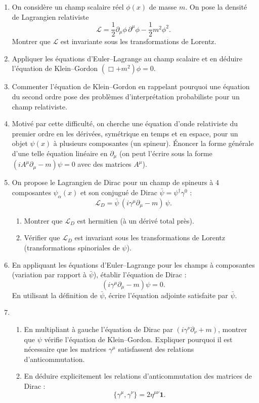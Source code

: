 \documentclass[a4paper,10pt]{report}
\begin{document}
\begin{enumerate}
	\item On considère un champ scalaire réel $\phi(x)$ de masse $m$. On pose la densité de Lagrangien relativiste 
	\[
	\mathcal{L} = \frac{1}{2} \partial_\mu \phi\,\partial^\mu \phi - \frac{1}{2} m^2 \phi^2.
	\]
	Montrer que $\mathcal{L}$ est invariante sous les transformations de Lorentz. 
	
	\item 
	Appliquer les équations d'Euler--Lagrange au champ scalaire et en déduire l'équation de Klein--Gordon $(\Box + m^2)\phi=0$. 
	
	\item 
	Commenter l'équation de Klein--Gordon en rappelant pourquoi une équation du second ordre pose des problèmes d'interprétation probabiliste pour un champ relativiste. 
	
	\item 
	Motivé par cette difficulté, on cherche une équation d'onde relativiste du premier ordre en les dérivées, symétrique en temps et en espace, pour un objet $\psi(x)$ à plusieurs composantes (un spineur). Énoncer la forme générale d'une telle équation linéaire en $\partial_\mu$ (on peut l'écrire sous la forme $(i A^\mu \partial_\mu - m)\psi=0$ avec des matrices $A^\mu$).
	
	\item
	On propose le Lagrangien de Dirac pour un champ de spineurs à 4 composantes $\psi_\alpha(x)$ et son conjugué de Dirac $\bar\psi = \psi^\dagger \gamma^0$ :
	\[
	\mathcal{L}_D = \bar\psi\, (i \gamma^\mu \partial_\mu - m)\,\psi.
	\]
	\begin{enumerate}
		\item Montrer que $\mathcal{L}_D$ est hermitien (à un dérivé total près). 
		\item Vérifier que $\mathcal{L}_D$ est invariant sous les transformations de Lorentz (transformations spinoriales de $\psi$). 
	\end{enumerate}
	
	\item 
	En appliquant les équations d'Euler--Lagrange pour les champs à composantes (variation par rapport à $\bar\psi$), établir l'équation de Dirac : 
	\[
	(i\gamma^\mu\partial_\mu - m)\psi = 0.
	\]
	En utilisant la définition de $\bar\psi$, écrire l'équation adjointe satisfaite par $\bar\psi$.
	
	\item 
	\begin{enumerate}
		\item En multipliant à gauche l'équation de Dirac par $(i\gamma^\nu \partial_\nu + m)$, montrer que $\psi$ vérifie l'équation de Klein--Gordon. Expliquer pourquoi il est nécessaire que les matrices $\gamma^\mu$ satisfassent des relations d'anticommutation.
		\item En déduire explicitement les relations d'anticommutation des matrices de Dirac : 
		\[
		\{\gamma^\mu,\gamma^\nu\} = 2\eta^{\mu\nu} \mathbf{1}.
		\]
	\end{enumerate}
	

\end{enumerate}
\end{document}
